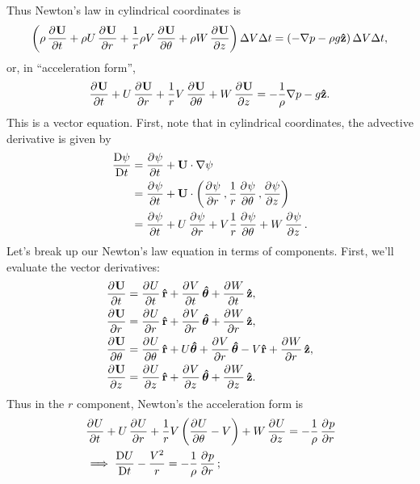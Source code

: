 \documentclass{article}
\def\*#1{\mathbf{#1}}
\newcommand{\rhat}{\mathbf{\hat{r}}}
\newcommand{\thetahat}{\boldsymbol{\hat{\theta}}}
\newcommand{\zhat}{\mathbf{\hat{z}}}
\newcommand{\dadvd}[2]{\dfrac{\text{D} #1}{\text{D} #2}} %
\begin{document}
%
Thus Newton's law in cylindrical coordinates is
%
\begin{equation*}
    \del{
        \rho \dpd{\*U}{t}
        + \rho U \dpd{\*U}{r}
        + \frac{1}{r} \rho V \dpd{\*U}{\theta}
        + \rho W \dpd{\*U}{z}
    } \Delta V \Delta t
    =
    \del{- \nabla p - \rho g \zhat} \Delta V \Delta t
    ,
\end{equation*}
%
or, in ``acceleration form'',
%
\begin{equation*}
    \dpd{\*U}{t}
    + U \dpd{\*U}{r}
    + \frac{1}{r} V \dpd{\*U}{\theta}
    + W \dpd{\*U}{z}
    =
    - \frac{1}{\rho} \nabla p - g \zhat
    .
\end{equation*}
%
This is a vector equation. First, note that in cylindrical coordinates,
the advective derivative is given by
%
\begin{align*}
    \dadvd{\psi}{t}
        &= \dpd{\psi}{t} + \*U \cdot \nabla \psi \\
        &= \dpd{\psi}{t} + \*U \cdot
            \del{
                \dpd{\psi}{r},
                \frac{1}{r} \dpd{\psi}{\theta},
                \dpd{\psi}{z}
            } \\
        &=
            \dpd{\psi}{t}
            + U \dpd{\psi}{r}
            + V \frac{1}{r} \dpd{\psi}{\theta}
            + W \dpd{\psi}{z}
        .
\end{align*}
%
Let's break up our Newton's law equation in terms of components.
First, we'll evaluate the vector derivatives:
%
\begin{align*}
    \dpd{\*U}{t} &= \dpd{U}{t} \rhat + \dpd{V}{t} \thetahat + \dpd{W}{t} \zhat, \\
    \dpd{\*U}{r}
        &= \dpd{U}{r} \rhat
            + \dpd{V}{r} \thetahat
            + \dpd{W}{r} \zhat
    ,
    \\
    \dpd{\*U}{\theta}
        &= \dpd{U}{\theta} \rhat
            + U \thetahat
            + \dpd{V}{r} \thetahat
            - V \rhat
            + \dpd{W}{r} \zhat
    ,
    \\
    \dpd{\*U}{z} &= \dpd{U}{z} \rhat + \dpd{V}{z} \thetahat + \dpd{W}{z} \zhat
    .
\end{align*}
%
Thus in the $r$ component, Newton's the acceleration form is
%
\begin{align*}
    &\dpd{U}{t}
    + U \dpd{U}{r}
    + \frac{1}{r} V \del{\dpd{U}{\theta} - V}
    + W \dpd{U}{z}
    =
    - \frac{1}{\rho} \dpd{p}{r}
    \\
    &\implies
    \dadvd{U}{t} - \frac{V^2}{r}
    =
    - \frac{1}{\rho} \dpd{p}{r}
    ;
\end{align*}
\end{document}
